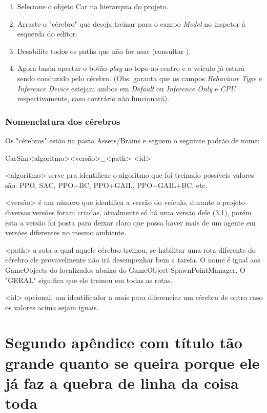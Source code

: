 \begin{apendicesenv}
\begin{enumerate}
    \item Selecione o objeto Car na hierarquia do projeto.
    \item Arraste o "cérebro" que deseja treinar para o campo \textit{Model} no inspetor à esquerda do editor.
    \item Desabilite todos os paths que não for usar (consultar ).
    \item Agora basta apertar o botão \textit{play} no topo ao centro e o veículo já estará sendo conduzido pelo cérebro. (Obs. garanta que os campos \textit{Behaviour Type} e \textit{Inference Device} estejam ambos em \textit{Default}  ou  \textit{Inference Only} e \textit{CPU} respectivamente, caso contrário não funcionará).
\end{enumerate}

\subsection*{Nomenclatura dos cérebros}\label{nomenclatura}
Os "cérebros" estão na pasta Assets/Brains e seguem o seguinte padrão de nome:

CarSim<algoritmo><versão>\_<path>-<id>

<algoritmo> serve pra identificar o algoritmo que foi treinado possíveis valores são: PPO, SAC, PPO+BC, PPO+GAIL, PPO+GAIL+BC, etc. 

<versão> é um número que identifica a versão do veículo, durante o projeto diversas versões foram criadas, atualmente só há uma versão dele (3.1), porém esta a versão foi posta para deixar claro que possa haver mais de um agente em versões diferentes no mesmo ambiente.

<path> a rota a qual aquele cérebro treinou, se habilitar uma rota diferente do cérebro ele provavelmente não irá desempenhar bem a tarefa. O nome é igual aos GameObjects do localizados abaixo do GameObject SpawnPointManager. O "GERAL" significa que ele treinou em todas as rotas.

<id> opcional, um identificador a mais para diferenciar um cérebro de outro caso os valores acima sejam iguais.


\chapter{Segundo apêndice com título tão grande quanto se queira porque ele já faz a quebra de linha da coisa toda}
\lipsum[51-53] %

\end{apendicesenv}
